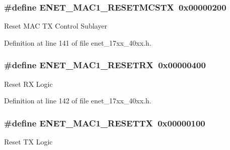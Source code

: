 \subsubsection[{\texorpdfstring{E\+N\+E\+T\+\_\+\+M\+A\+C1\+\_\+\+R\+E\+S\+E\+T\+M\+C\+S\+TX}{ENET_MAC1_RESETMCSTX}}]{\setlength{\rightskip}{0pt plus 5cm}\#define E\+N\+E\+T\+\_\+\+M\+A\+C1\+\_\+\+R\+E\+S\+E\+T\+M\+C\+S\+TX~0x00000200}\hypertarget{group__ENET__17XX__40XX_ga929295618f7227006918b172c37274ba}{}\label{group__ENET__17XX__40XX_ga929295618f7227006918b172c37274ba}
Reset M\+AC TX Control Sublayer 

Definition at line 141 of file enet\+\_\+17xx\+\_\+40xx.\+h.

\subsubsection[{\texorpdfstring{E\+N\+E\+T\+\_\+\+M\+A\+C1\+\_\+\+R\+E\+S\+E\+T\+RX}{ENET_MAC1_RESETRX}}]{\setlength{\rightskip}{0pt plus 5cm}\#define E\+N\+E\+T\+\_\+\+M\+A\+C1\+\_\+\+R\+E\+S\+E\+T\+RX~0x00000400}\hypertarget{group__ENET__17XX__40XX_ga08220afd93ff8aaee439369cbda83d55}{}\label{group__ENET__17XX__40XX_ga08220afd93ff8aaee439369cbda83d55}
Reset RX Logic 

Definition at line 142 of file enet\+\_\+17xx\+\_\+40xx.\+h.

\subsubsection[{\texorpdfstring{E\+N\+E\+T\+\_\+\+M\+A\+C1\+\_\+\+R\+E\+S\+E\+T\+TX}{ENET_MAC1_RESETTX}}]{\setlength{\rightskip}{0pt plus 5cm}\#define E\+N\+E\+T\+\_\+\+M\+A\+C1\+\_\+\+R\+E\+S\+E\+T\+TX~0x00000100}\hypertarget{group__ENET__17XX__40XX_gaf1ab84b82270514182f96bf19db18b38}{}\label{group__ENET__17XX__40XX_gaf1ab84b82270514182f96bf19db18b38}
Reset TX Logic 

